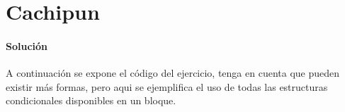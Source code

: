 \section{Cachipun}

    \paragraph{Solución}
    A continuación se expone el código del ejercicio, tenga en cuenta que pueden existir más formas, pero aqui se ejemplifica el uso de todas las estructuras condicionales disponibles en un bloque.
    
    
